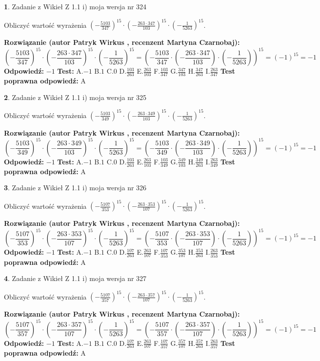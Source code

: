 \documentclass[12pt, a4paper]{article}
\theoremstyle{definition} %
\newtheorem{zad}{}
\newcommand{\zadStart}[1]{\begin{zad}#1\newline}
\newcommand{\zadStop}{\end{zad}}
\newcommand{\rozwStart}[2]{\noindent \textbf{Rozwiązanie (autor #1 , recenzent #2): }\newline}
\newcommand{\rozwStop}{\newline}
\newcommand{\odpStart}{\noindent \textbf{Odpowiedź:}\newline}
\newcommand{\odpStop}{\newline}
\newcommand{\testStart}{\noindent \textbf{Test:}\newline}
\newcommand{\testStop}{\newline}
\newcommand{\kluczStart}{\noindent \textbf{Test poprawna odpowiedź:}\newline}
\newcommand{\kluczStop}{\newline}
\begin{document}
\zadStart{Zadanie z Wikieł Z 1.1 i) moja wersja nr 324}

Obliczyć wartość wyrażenia $(-\frac{5103}{347})^{15} \cdot (-\frac{263 \cdot 347}{103})^{15} \cdot (-\frac{1}{5263})^{15}$.
\zadStop
\rozwStart{Patryk Wirkus}{Martyna Czarnobaj}
$$(-\frac{5103}{347})^{15} \cdot (-\frac{263 \cdot 347}{103})^{15} \cdot (-\frac{1}{5263})^{15} = (-\frac{5103}{347} \cdot (-\frac{263 \cdot 347}{103}) \cdot (-\frac{1}{5263}))^{15} = (-1)^{15} = -1$$
\rozwStop
\odpStart
$-1$
\odpStop
\testStart
A.$-1$ B.$1$ C.$0$ D.$\frac{103}{263}$ E.$\frac{263}{103}$
F.$\frac{103}{347}$ G.$\frac{347}{103}$
H.$\frac{347}{263}$
I.$\frac{263}{347}$
\testStop
\kluczStart
A
\kluczStop



\zadStart{Zadanie z Wikieł Z 1.1 i) moja wersja nr 325}

Obliczyć wartość wyrażenia $(-\frac{5103}{349})^{15} \cdot (-\frac{263 \cdot 349}{103})^{15} \cdot (-\frac{1}{5263})^{15}$.
\zadStop
\rozwStart{Patryk Wirkus}{Martyna Czarnobaj}
$$(-\frac{5103}{349})^{15} \cdot (-\frac{263 \cdot 349}{103})^{15} \cdot (-\frac{1}{5263})^{15} = (-\frac{5103}{349} \cdot (-\frac{263 \cdot 349}{103}) \cdot (-\frac{1}{5263}))^{15} = (-1)^{15} = -1$$
\rozwStop
\odpStart
$-1$
\odpStop
\testStart
A.$-1$ B.$1$ C.$0$ D.$\frac{103}{263}$ E.$\frac{263}{103}$
F.$\frac{103}{349}$ G.$\frac{349}{103}$
H.$\frac{349}{263}$
I.$\frac{263}{349}$
\testStop
\kluczStart
A
\kluczStop



\zadStart{Zadanie z Wikieł Z 1.1 i) moja wersja nr 326}

Obliczyć wartość wyrażenia $(-\frac{5107}{353})^{15} \cdot (-\frac{263 \cdot 353}{107})^{15} \cdot (-\frac{1}{5263})^{15}$.
\zadStop
\rozwStart{Patryk Wirkus}{Martyna Czarnobaj}
$$(-\frac{5107}{353})^{15} \cdot (-\frac{263 \cdot 353}{107})^{15} \cdot (-\frac{1}{5263})^{15} = (-\frac{5107}{353} \cdot (-\frac{263 \cdot 353}{107}) \cdot (-\frac{1}{5263}))^{15} = (-1)^{15} = -1$$
\rozwStop
\odpStart
$-1$
\odpStop
\testStart
A.$-1$ B.$1$ C.$0$ D.$\frac{107}{263}$ E.$\frac{263}{107}$
F.$\frac{107}{353}$ G.$\frac{353}{107}$
H.$\frac{353}{263}$
I.$\frac{263}{353}$
\testStop
\kluczStart
A
\kluczStop



\zadStart{Zadanie z Wikieł Z 1.1 i) moja wersja nr 327}

Obliczyć wartość wyrażenia $(-\frac{5107}{357})^{15} \cdot (-\frac{263 \cdot 357}{107})^{15} \cdot (-\frac{1}{5263})^{15}$.
\zadStop
\rozwStart{Patryk Wirkus}{Martyna Czarnobaj}
$$(-\frac{5107}{357})^{15} \cdot (-\frac{263 \cdot 357}{107})^{15} \cdot (-\frac{1}{5263})^{15} = (-\frac{5107}{357} \cdot (-\frac{263 \cdot 357}{107}) \cdot (-\frac{1}{5263}))^{15} = (-1)^{15} = -1$$
\rozwStop
\odpStart
$-1$
\odpStop
\testStart
A.$-1$ B.$1$ C.$0$ D.$\frac{107}{263}$ E.$\frac{263}{107}$
F.$\frac{107}{357}$ G.$\frac{357}{107}$
H.$\frac{357}{263}$
I.$\frac{263}{357}$
\testStop
\kluczStart
A
\kluczStop
\end{document}

